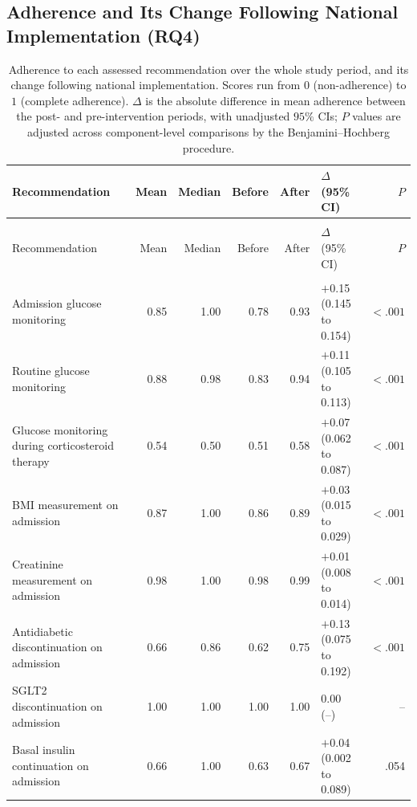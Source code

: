 \subsection{Adherence and Its Change Following National Implementation (RQ4)}

\begingroup
\singlespacing
\small
\setlength{\tabcolsep}{4pt}
\begin{longtable}{>{\raggedright\arraybackslash}p{}rrrrlr}
\caption{Adherence to each assessed recommendation over the whole study period, and its change following national implementation. Scores run from $0$ (non-adherence) to $1$ (complete adherence). $\Delta$ is the absolute difference in mean adherence between the post- and pre-intervention periods, with unadjusted $95\%$ CIs; $P$ values are adjusted across component-level comparisons by the Benjamini--Hochberg procedure.}
\label{tab:adherence}\\
\toprule
Recommendation & Mean & Median & Before & After & $\Delta$ (95\% CI) & $P$ \\
\midrule
\endfirsthead
\multicolumn{7}{l}{\footnotesize\itshape Table \thetable\ continued from previous page}\\
\toprule
Recommendation & Mean & Median & Before & After & $\Delta$ (95\% CI) & $P$ \\
\midrule
\endhead
\midrule
\multicolumn{7}{r}{\footnotesize\itshape continued on next page}\\
\endfoot
\bottomrule
\endlastfoot
Admission glucose monitoring
  & 0.85 & 1.00 & 0.78 & 0.93 & $+$0.15 (0.145 to 0.154) & $<.001$ \\
Routine glucose monitoring
  & 0.88 & 0.98 & 0.83 & 0.94 & $+$0.11 (0.105 to 0.113) & $<.001$ \\
Glucose monitoring during corticosteroid therapy
  & 0.54 & 0.50 & 0.51 & 0.58 & $+$0.07 (0.062 to 0.087) & $<.001$ \\
BMI measurement on admission
  & 0.87 & 1.00 & 0.86 & 0.89 & $+$0.03 (0.015 to 0.029) & $<.001$ \\
Creatinine measurement on admission
  & 0.98 & 1.00 & 0.98 & 0.99 & $+$0.01 (0.008 to 0.014) & $<.001$ \\
Antidiabetic discontinuation on admission
  & 0.66 & 0.86 & 0.62 & 0.75 & $+$0.13 (0.075 to 0.192) & $<.001$ \\
SGLT2 discontinuation on admission
  & 1.00 & 1.00 & 1.00 & 1.00 & 0.00 (--) & -- \\
Basal insulin continuation on admission
  & 0.66 & 1.00 & 0.63 & 0.67 & $+$0.04 (0.002 to 0.089) & .054 \\

\end{longtable}
